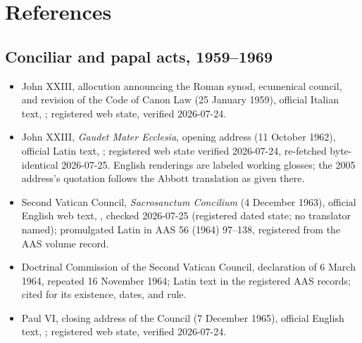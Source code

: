 \section{References}

\begingroup
\setlength{\parskip}{0pt}
\titlespacing*{\subsection}{0pt}{1.0ex}{0.3ex}

\subsection*{Conciliar and papal acts, 1959--1969}

{\fontsize{8.6}{9.6}\selectfont
\begin{itemize}[itemsep=0pt,parsep=0pt,topsep=0.05em]
\item John XXIII, allocution announcing the Roman synod, ecumenical council, and revision of the Code of Canon Law (25 January 1959), official Italian text, ; registered web state, verified 2026-07-24.
\item John XXIII, \emph{Gaudet Mater Ecclesia}, opening address (11 October 1962), official Latin text, ; registered web state verified 2026-07-24, re-fetched byte-identical 2026-07-25. English renderings are labeled working glosses; the 2005 address's quotation follows the Abbott translation as given there.
\item Second Vatican Council, \emph{Sacrosanctum Concilium} (4 December 1963), official English web text, , checked 2026-07-25 (registered dated state; no translator named); promulgated Latin in AAS 56 (1964) 97--138, registered from the AAS volume record.
\item Doctrinal Commission of the Second Vatican Council, declaration of 6 March 1964, repeated 16 November 1964; Latin text in the registered AAS records; cited for its existence, dates, and rule.
\item Paul VI, closing address of the Council (7 December 1965), official English text, ; registered web state, verified 2026-07-24.

\end{itemize}}
